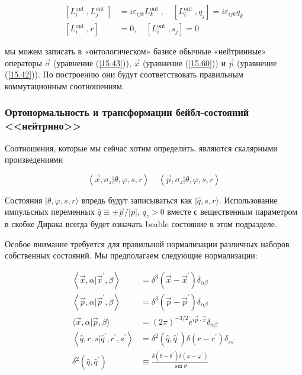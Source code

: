 \documentclass[main.tex]{subfiles}
\begin{document}
\begin{equation}\label{15.66}
	\begin{aligned}
\left[L_{i}^{\text {ont }}, L_{j}^{\text {ont }}\right] &=i \varepsilon_{i j k} L_{k}^{\text {ont }}, \quad\left[L_{i}^{\text {ont }}, q_{j}\right]=i \varepsilon_{i j k} q_{k} \\
\left[L_{i}^{\text {ont }}, r\right] &=0, \quad\left[L_{i}^{\text {ont }}, s_{j}\right]=0
\end{aligned}
\end{equation}
                          
мы можем записать в «онтологическом» базисе обычные «нейтринные» операторы $\vec \sigma$ (уравнение (\ref{15.43})), $\vec x$ (уравнение (\ref{15.60})) и $\vec p$ (уравнение (\ref{15.42})). По построению они будут соответствовать правильным коммутационным соотношениям.


\subsubsection{Ортонормальность и трансформации бейбл-состояний <<нейтрино>>}\label{ch15.2.2}

Соотношения, которые мы сейчас хотим определить, являются скалярными произведениями

\begin{equation}\label{15.67}
	\left\langle\vec{x}, \sigma_{z} | \theta, \varphi, s, r\right\rangle \quad
\left\langle\vec{p}, \sigma_{z} | \theta, \varphi, s, r\right\rangle
\end{equation}

Состояния $|\theta, \varphi, s, r\rangle$ впредь будут записываться как $|\hat q, s, r\rangle$. Использование импульсных переменных $\hat q \equiv \pm \vec p/|p|$, $q_z> 0$ вместе с вещественным параметром в скобке Дирака всегда будет означать beable состояние в этом подразделе.

Особое внимание требуется для правильной нормализации различных наборов собственных состояний. Мы предполагаем следующие нормализации:

\begin{equation}\label{15.68}
	\begin{aligned}
\left\langle\vec{x}, \alpha | \vec{x}^{\prime}, \beta\right\rangle &=\delta^{3}\left(\vec{x}-\vec{x}^{\prime}\right) \delta_{\alpha \beta} \\
\left\langle\vec{p}, \alpha | \vec{p}^{\prime}, \beta\right\rangle &=\delta^{3}\left(\vec{p}-\vec{p}^{\prime}\right) \delta_{\alpha \beta} \\
\langle\vec{x}, \alpha | \vec{p}, \beta\rangle &=(2 \pi)^{-3 / 2} e^{i \vec{p} \cdot \vec{x}} \delta_{\alpha \beta} \\
\left\langle\hat{q}, r, s | \hat{q}^{\prime}, r^{\prime}, s^{\prime}\right\rangle &=\delta^{2}\left(\hat{q}, \hat{q}^{\prime}\right) \delta\left(r-r^{\prime}\right) \delta_{s s^{\prime}} \\
\delta^{2}\left(\hat{q}, \hat{q}^{\prime}\right) & \equiv \frac{\delta\left(\theta-\theta^{\prime}\right) \delta\left(\varphi-\varphi^{\prime}\right)}{\sin \theta}
\end{aligned}
\end{equation}
\end{document}
